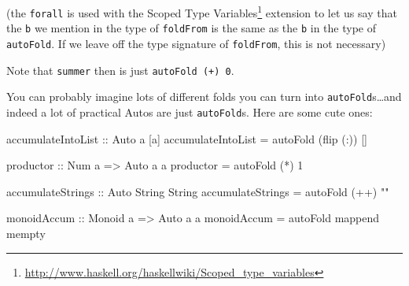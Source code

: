 \documentclass[]{article}
\newenvironment{Shaded}{}{}
\newcommand{\KeywordTok}[1]{\textcolor[rgb]{0.00,0.44,0.13}{\textbf{{#1}}}}
\newcommand{\DataTypeTok}[1]{\textcolor[rgb]{0.56,0.13,0.00}{{#1}}}
\newcommand{\DecValTok}[1]{\textcolor[rgb]{0.25,0.63,0.44}{{#1}}}
\newcommand{\StringTok}[1]{\textcolor[rgb]{0.25,0.44,0.63}{{#1}}}
\newcommand{\OtherTok}[1]{\textcolor[rgb]{0.00,0.44,0.13}{{#1}}}
\newcommand{\FunctionTok}[1]{\textcolor[rgb]{0.02,0.16,0.49}{{#1}}}
\newcommand{\NormalTok}[1]{{#1}}
\renewcommand{\href}[2]{#2\footnote{\url{#1}}}
\begin{document}
\begin{Shaded}
\end{Shaded}

(the \texttt{forall} is used with the
\href{http://www.haskell.org/haskellwiki/Scoped_type_variables}{Scoped Type Variables} extension to
let us say that the \texttt{b} we mention in the type of \texttt{foldFrom} is the same as the
\texttt{b} in the type of \texttt{autoFold}. If we leave off the type signature of
\texttt{foldFrom}, this is not necessary)

Note that \texttt{summer} then is just \texttt{autoFold\ (+)\ 0}.

You can probably imagine lots of different folds you can turn into \texttt{autoFold}s\ldots{}and
indeed a lot of practical Autos are just \texttt{autoFold}s. Here are some cute ones:

\begin{Shaded}
\begin{Highlighting}[]
\OtherTok{accumulateIntoList ::} \DataTypeTok{Auto} \NormalTok{a [a]}
\NormalTok{accumulateIntoList }\FunctionTok{=} \NormalTok{autoFold (flip (}\FunctionTok{:}\NormalTok{)) []}

\OtherTok{productor ::} \DataTypeTok{Num} \NormalTok{a }\OtherTok{=>} \DataTypeTok{Auto} \NormalTok{a a}
\NormalTok{productor }\FunctionTok{=} \NormalTok{autoFold (}\FunctionTok{*}\NormalTok{) }\DecValTok{1}

\OtherTok{accumulateStrings ::} \DataTypeTok{Auto} \DataTypeTok{String} \DataTypeTok{String}
\NormalTok{accumulateStrings }\FunctionTok{=} \NormalTok{autoFold (}\FunctionTok{++}\NormalTok{) }\StringTok{""}

\OtherTok{monoidAccum ::} \DataTypeTok{Monoid} \NormalTok{a }\OtherTok{=>} \DataTypeTok{Auto} \NormalTok{a a}
\NormalTok{monoidAccum }\FunctionTok{=} \NormalTok{autoFold mappend mempty}
\end{Highlighting}
\end{Shaded}
\end{document}
